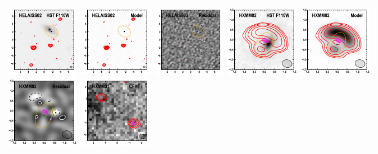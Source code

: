 \documentclass[iop]{emulateapj}
\begin{document}
\begin{figure}[!tbp] 
    \begin{centering}
\includegraphics[width=0.162\textwidth]{../Figures/modelfit/HELAISS02_optical_bestfit.pdf}
\includegraphics[width=0.162\textwidth]{../Figures/modelfit/HELAISS02_model_bestfit.pdf}
\includegraphics[width=0.162\textwidth]{../Figures/modelfit/HELAISS02_residual_bestfit.pdf}
\includegraphics[width=0.162\textwidth]{../Figures/modelfit/HXMM02_optical_bestfit.pdf}
\includegraphics[width=0.162\textwidth]{../Figures/modelfit/HXMM02_model_bestfit.pdf}
\includegraphics[width=0.162\textwidth]{../Figures/modelfit/HXMM02_residual_bestfit.pdf}
\includegraphics[width=0.162\textwidth]{../Figures/modelfit/HXMM31_optical_bestfit.pdf}

\end{centering}
\end{figure}
\end{document}
